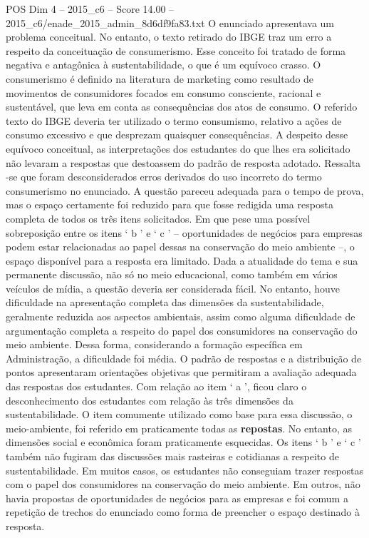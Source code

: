 \begin{textsample}{POS Dim 4 – 2015\_c6 – Score 14.00 – 2015\_c6/enade\_2015\_admin\_8d6df9fa83.txt}
O enunciado apresentava um problema conceitual.
No entanto, o texto retirado do IBGE traz um erro a respeito da conceituação de consumerismo.
Esse conceito foi tratado de forma negativa e antagônica à sustentabilidade, o que é um equívoco crasso.
O consumerismo é definido na literatura de marketing como resultado de movimentos de consumidores focados em consumo consciente, racional e sustentável, que leva em conta as consequências dos atos de consumo.
O referido texto do IBGE deveria ter utilizado o termo consumismo, relativo a ações de consumo excessivo e que desprezam quaisquer consequências.
A despeito desse equívoco conceitual, as interpretações dos estudantes do que lhes era solicitado não levaram a respostas que destoassem do padrão de resposta adotado.
Ressalta -se que foram desconsiderados erros derivados do uso incorreto do termo consumerismo no enunciado.
A questão pareceu adequada para o tempo de prova, mas o espaço certamente foi reduzido para que fosse redigida uma resposta completa de todos os três itens solicitados.
Em que pese uma possível sobreposição entre os itens ‘ b ’ e ‘ c ’ – oportunidades de negócios para empresas podem estar relacionadas ao papel dessas na conservação do meio ambiente –, o espaço disponível para a resposta era limitado.
Dada a atualidade do tema e sua permanente discussão, não só no meio educacional, como também em vários veículos de mídia, a questão deveria ser considerada fácil.
No entanto, houve dificuldade na apresentação completa das dimensões da sustentabilidade, geralmente reduzida aos aspectos ambientais, assim como alguma dificuldade de argumentação completa a respeito do papel dos consumidores na conservação do meio ambiente.
Dessa forma, considerando a formação específica em Administração, a dificuldade foi média.
O padrão de respostas e a distribuição de pontos apresentaram orientações objetivas que permitiram a avaliação adequada das respostas dos estudantes.
Com relação ao item ‘ a ’, ficou claro o desconhecimento dos estudantes com relação às três dimensões da sustentabilidade.
O item comumente utilizado como base para essa discussão, o meio-ambiente, foi referido em praticamente todas as \textbf{repostas}.
No entanto, as dimensões social e econômica foram praticamente esquecidas.
Os itens ‘ b ’ e ‘ c ’ também não fugiram das discussões mais rasteiras e cotidianas a respeito de sustentabilidade.
Em muitos casos, os estudantes não conseguiam trazer respostas com o papel dos consumidores na conservação do meio ambiente.
Em outros, não havia propostas de oportunidades de negócios para as empresas e foi comum a repetição de trechos do enunciado como forma de preencher o espaço destinado à resposta.

\end{textsample}
